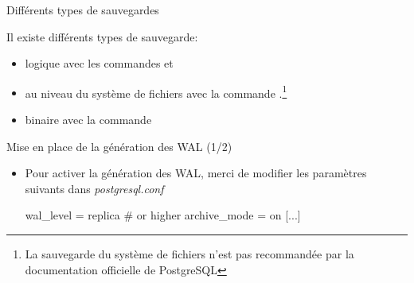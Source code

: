 
\begin{frame}[fragile]{Différents types de sauvegardes}

Il existe différents types de sauvegarde:

\begin{itemize}

   \item logique avec les commandes  et 
   \item au niveau du système de fichiers avec la commande .\footnote{La sauvegarde du système de fichiers n'est pas recommandée par la documentation officielle de PostgreSQL}
   \item binaire avec la commande 

\end{itemize}

\begin{toile}
\end{toile}

\end{frame}


\begin{frame}[fragile]{Mise en place de la génération des WAL (1/2)}

\begin{itemize}

   \item Pour activer la génération des WAL, merci de modifier les paramètres suivants dans \textit{postgresql.conf}

\begin{intercom}
wal\_level = replica # or higher
archive\_mode = on
[...]
\end{intercom}

\end{itemize}

\begin{toile}
\end{toile}

\end{frame}


